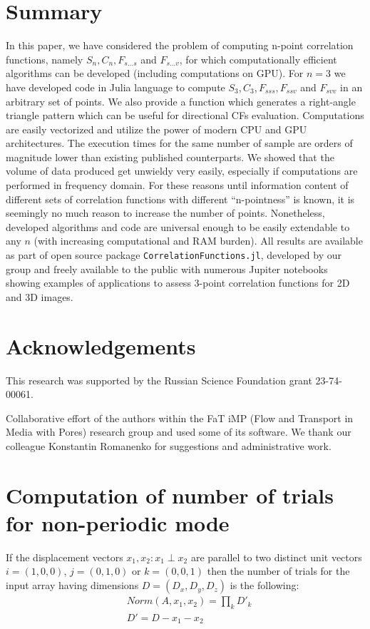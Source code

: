 \documentclass[reprint,amsmath,amssymb,aps,pre,showkeys,showpacs]{revtex4-1}
\newcommand{\code}[1]{\colorbox{light-gray}{\texttt{#1}}}
\begin{document}
\section{Summary}
In this paper, we have considered the problem of computing n-point correlation
functions, namely $S_n, C_n, F_{s...s}$ and $F_{s...v}$, for which
computationally efficient algorithms can be developed (including computations on
GPU). For $n=3$ we have developed code in Julia language to compute $S_3, C_3,
F_{sss}, F_{ssv}$ and $F_{svv}$ in an arbitrary set of points. We also provide a
function which generates a right-angle triangle pattern which can be useful for
directional CFs evaluation. Computations are easily
vectorized and utilize the power of modern CPU and GPU architectures. The
execution times for the same number of sample are orders of magnitude lower than
existing published counterparts. We showed that the volume of data produced get
unwieldy very easily, especially if computations are performed in frequency
domain. For these reasons until information content of different sets of
correlation functions with different ``n-pointness'' is known, it is seemingly no
much reason to increase the number of points. Nonetheless, developed algorithms
and code are universal enough to be easily extendable to any $n$ (with
increasing computational and RAM burden). All results are available as part of
open source package \code{CorrelationFunctions.jl}, developed by our group and
freely available to the public with numerous Jupiter notebooks showing examples
of applications to assess 3-point correlation functions for 2D and 3D images.

\section{Acknowledgements}
This research was supported by the Russian Science Foundation grant 23-74-00061.

Collaborative effort of the authors within the FaT iMP (Flow and Transport in
Media with Pores) research group and used some of its software. We thank our
colleague Konstantin Romanenko for suggestions and administrative work.

\appendix
\section{Computation of number of trials for non-periodic mode}
\label{sec:number-of-trials}
If the displacement vectors $x_1, x_2: x_1 \perp x_2$ are parallel to two
distinct unit vectors $i=(1,0,0)$, $j=(0,1,0)$ or $k=(0,0,1)$ then the number of
trials for the input array having dimensions $D = (D_x, D_y, D_z)$ is the
following:
\begin{equation}
  \begin{aligned}
    & Norm(A, x_1, x_2) = \prod_k D'_k \\
    & D' = D - x_1 - x_2
  \end{aligned}
\end{equation}
\end{document}
